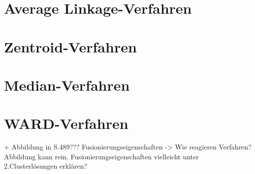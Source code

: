 \section{Average Linkage-Verfahren}
\section{Zentroid-Verfahren}
\section{Median-Verfahren}
\section{WARD-Verfahren}

+ Abbildung in \cite{Backhaus.2016} S.489??? Fusionierungseigenschaften -> Wie reagieren Verfahren?
Abbildung kann rein, Fusionierungseigenschaften vielleicht unter 2.Clusterlösungen erklären?
